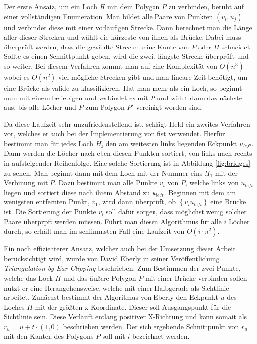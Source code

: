 Der erste Ansatz, um ein Loch $H$ mit dem Polygon $P$ zu verbinden, beruht auf einer vollständigen Enumeration. Man bildet alle Paare von Punkten $(v_i,u_j)$ und verbindet diese mit einer vorläufigen Strecke. Dann berechnet man die Länge aller dieser Strecken und wählt die kürzeste von ihnen als Brücke.
Dabei muss überprüft werden, dass die gewählte Strecke keine Kante von $P$ oder $H$ schneidet. Sollte es einen Schnittpunkt geben, wird die zweit längste Strecke überprüft und so weiter. Bei diesem Verfahren kommt man auf eine Komplexität von $O(n^3)$ wobei es $O(n^2)$ viel mögliche Strecken gibt und man 
lineare Zeit benötigt, um eine Brücke als valide zu klassifizieren. Hat man mehr als ein Loch, so beginnt man mit einem beliebigen und verbindet es mit $P$ und wählt dann das nächste aus, bis alle Löcher und $P$ zum Polygon $P'$ vereinigt worden sind.

Da diese Laufzeit sehr unzufriedenstellend ist, schlägt Held ein zweites Verfahren vor, welches er auch bei der Implementierung von \ac{fist} verwendet.
Hierfür bestimmt man für jedes Loch $H_j$ den am weitesten links liegenden Eckpunkt $u_{left}$. Dann werden die Löcher nach eben diesen Punkten sortiert, von links nach rechts in aufsteigender Reihenfolge. Eine solche Sortierung ist in Abbildung \ref{fig:bridges} zu sehen.
Man beginnt dann mit dem Loch mit der Nummer eins $H_1$ mit der Verbinung mit $P$. Dazu bestimmt man alle Punkte $v_i$ von $P$, welche links von $u_{left}$ liegen und sortiert diese nach ihrem Abstand zu $u_{left}$.
Beginnen mit dem am wenigsten entfernten Punkt, $v_1$, wird dann überprüft, ob $\left\{v_iu_{left}\right\}$ eine Brücke ist. Die Sortierung der Punkte $v_i$ soll dafür sorgen, dass möglichst wenig solcher Paare überprpft werden müssen.
Führt man diesen Algorithmus für alle $i$ Löcher durch, so erhält man im schlimmsten Fall eine Laufzeit von $O(i\cdot n^2)$.

Ein noch effizienterer Ansatz, welcher auch bei der Umsetzung dieser Arbeit berücksichtigt wird, wurde von David Eberly in seiner Veröffentlichung \emph{Triangulation by Ear Clipping} beschrieben.\cite{eberly}
Zum Bestimmen der zwei Punkte, welche das Loch $H$ und das äußere Polygon $P$ mit einer Brücke verbinden sollen nutzt er eine Herangehensweise, welche mit einer Halbgerade als Sichtlinie arbeitet.
Zunächst bestimmt der Algoritmus von Eberly den Eckpunkt $u$ des Loches $H$ mit der größten x-Koordinate. Dieser soll Ausgangspunkt für die Sichtlinie sein. Diese Verläuft entlang positiver X-Richtung und kann somait als $r_u = u + t \cdot (1,0)$ beschrieben werden.
Der sich ergebende Schnittpunkt von $r_u$ mit den Kanten des Polygons $P$ soll mit $i$ bezeichnet werden. 

